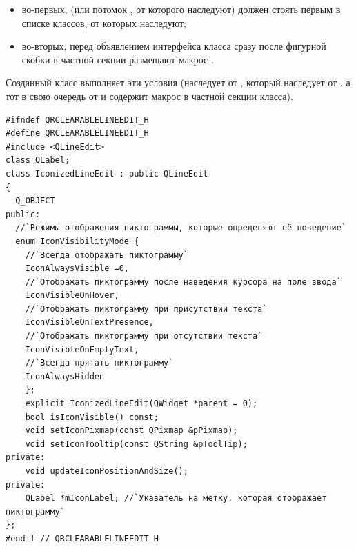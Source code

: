 \begin{itemize}
\item во-первых,  (или потомок , от которого наследуют) должен стоять первым в списке
классов, от которых наследуют;
\item во-вторых, перед объявлением интерфейса класса сразу после фигурной скобки в частной секции размещают макрос
. 
\end{itemize}
Созданный класс выполняет эти условия (наследует от , который наследует от , а тот в
свою очередь от  и содержит макрос  в частной секции класса).
\begin{lstlisting}
#ifndef QRCLEARABLELINEEDIT_H
#define QRCLEARABLELINEEDIT_H
#include <QLineEdit>
class QLabel;
class IconizedLineEdit : public QLineEdit
{
  Q_OBJECT
public:
  //`Режимы отображения пиктограммы, которые определяют её поведение`
  enum IconVisibilityMode {
    //`Всегда отображать пиктограмму`
    IconAlwaysVisible =0,
    //`Отображать пиктограмму после наведения курсора на поле ввода`
    IconVisibleOnHover,
    //`Отображать пиктограмму при присутствии текста`
    IconVisibleOnTextPresence,
    //`Отображать пиктограмму при отсутствии текста`
    IconVisibleOnEmptyText,
    //`Всегда прятать пиктограмму`
    IconAlwaysHidden
    };
    explicit IconizedLineEdit(QWidget *parent = 0);
    bool isIconVisible() const;
    void setIconPixmap(const QPixmap &pPixmap);
    void setIconTooltip(const QString &pToolTip);
private:
    void updateIconPositionAndSize();
private:
    QLabel *mIconLabel; //`Указатель на метку, которая отображает пиктограмму`
};
#endif // QRCLEARABLELINEEDIT_H
\end{lstlisting}


